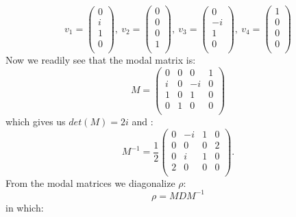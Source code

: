 \begin{itemize}
\begin{equation}
v_1=\left(
\begin{array}{c}
 0 \\
 i\\
 1\\
 0 \\
\end{array}
\right),
\:  v_2=\left(
\begin{array}{c}
 0 \\
 0\\
 0\\
 1 \\
\end{array}
\right),
\:  v_3= \left(
\begin{array}{c}
 0 \\
 -i\\
 1\\
 0 \\
\end{array}
\right),\:  v_4= 
\left(
\begin{array}{c}
 1 \\
 0\\
 0\\
 0 \\
\end{array}
\right)
\end{equation}
Now we readily see that the modal matrix is:
\begin{equation}
M=
\left( \begin{array}{cccc}
 0 & 0 & 0 & 1 \\
 i & 0 & -i & 0 \\
 1 & 0 & 1 & 0 \\
 0 & 1 & 0 & 0 \\
\end{array}
\right)
\end{equation}
which gives us $det(M)=2i$ and : 
\begin{equation}
M^{-1}=\frac{1}{2}
\left( \begin{array}{cccc}
 0 & -i & 1 & 0 \\
 0 & 0 & 0 & 2 \\
 0 & i & 1 & 0 \\
 2 & 0 & 0 & 0 \\
\end{array}
\right).
\end{equation}
From the modal matrices we diagonalize $\rho$:
\begin{equation}
\rho=MDM^{-1}
\end{equation}
in which:
\begin{equation}

\end{equation}
\end{itemize}
